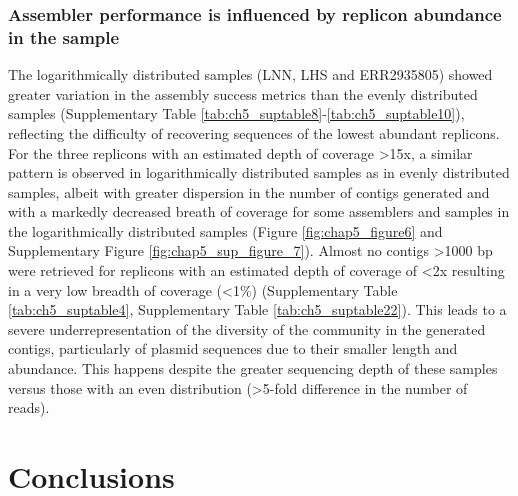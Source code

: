 \subsubsection{Assembler performance is influenced by replicon abundance in the sample}

The logarithmically distributed samples (LNN, LHS and ERR2935805) showed greater variation in the assembly success metrics than the evenly distributed samples (Supplementary Table \ref{tab:ch5_suptable8}-\ref{tab:ch5_suptable10}), reflecting the difficulty of recovering sequences of the lowest abundant replicons. For the three replicons with an estimated depth of coverage >15x, a similar pattern is observed in logarithmically distributed samples as in evenly distributed samples, albeit with greater dispersion in the number of contigs generated and with a markedly decreased breath of coverage for some assemblers and samples in the logarithmically distributed samples (Figure \ref{fig:chap5_figure6} and Supplementary Figure \ref{fig:chap5_sup_figure_7}). Almost no contigs >1000 \ac{bp} were retrieved for replicons with an estimated depth of coverage of <2x resulting in a very low breadth of coverage (<1\%) (Supplementary Table \ref{tab:ch5_suptable4}, Supplementary Table \ref{tab:ch5_suptable22}). This leads to a severe underrepresentation of the diversity of the community in the generated contigs, particularly of plasmid sequences due to their smaller length and abundance. This happens despite the greater sequencing depth of these samples versus those with an even distribution (>5-fold difference in the number of reads).

\section{Conclusions}

